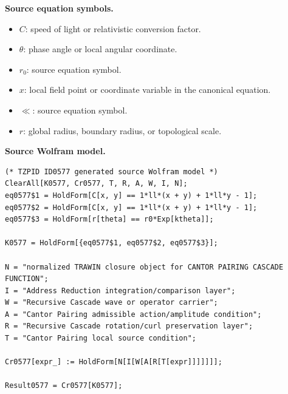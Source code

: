 \begin{minipage}[t]{0.49\linewidth}
\begingroup
\small
\raggedright
\textbf{Source equation symbols.}\par
\begin{itemize}[leftmargin=1.35em,itemsep=1pt,topsep=1pt,parsep=0pt]
    \item $C$: speed of light or relativistic conversion factor.
    \item $\theta$: phase angle or local angular coordinate.
    \item $r_0$: source equation symbol.
    \item $x$: local field point or coordinate variable in the canonical equation.
    \item $\ll$: source equation symbol.
    \item $r$: global radius, boundary radius, or topological scale.
\end{itemize}
\endgroup
\end{minipage}\hfill
\begin{minipage}[t]{0.47\linewidth}
\begingroup
\scriptsize
\raggedright
\textbf{Source Wolfram model.}\par
\begin{Verbatim}[fontsize=\tiny,breaklines=true,breakanywhere=true]
(* TZPID ID0577 generated source Wolfram model *)
ClearAll[K0577, Cr0577, T, R, A, W, I, N];
eq0577$1 = HoldForm[C[x, y] == 1*ll*(x + y) + 1*ll*y - 1];
eq0577$2 = HoldForm[C[x, y] == 1*ll*(x + y) + 1*ll*y - 1];
eq0577$3 = HoldForm[r[theta] == r0*Exp[ktheta]];

K0577 = HoldForm[{eq0577$1, eq0577$2, eq0577$3}];

N = "normalized TRAWIN closure object for CANTOR PAIRING CASCADE FUNCTION";
I = "Address Reduction integration/comparison layer";
W = "Recursive Cascade wave or operator carrier";
A = "Cantor Pairing admissible action/amplitude condition";
R = "Recursive Cascade rotation/curl preservation layer";
T = "Cantor Pairing local source condition";

Cr0577[expr_] := HoldForm[N[I[W[A[R[T[expr]]]]]]];

Result0577 = Cr0577[K0577];
\end{Verbatim}
\endgroup
\end{minipage}


